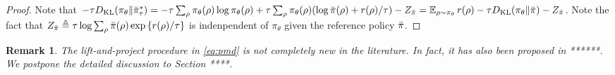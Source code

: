 \documentclass{article} %
\newtheorem{remark}{Remark}
\begin{document}
\begin{proof}
Note that $-\tau D_{\mathrm{KL}}(\pi_\theta \| \bar{\pi}_\tau^*) = - \tau \sum_{\rho}{ \pi_\theta(\rho) \log \pi_\theta(\rho) } + \tau \sum_{\rho}{ \pi_\theta(\rho) (\log \bar{\pi}(\rho) + r(\rho) / \tau ) }  - Z_{\bar{\pi}} = \operatorname*{\mathbb{E}}_{\rho \sim \pi_\theta}{  r(\rho)  - \tau D_{\mathrm{KL}}(\pi_\theta \| \bar{\pi}) } - Z_{\bar{\pi}}$. Note the fact that $Z_{\bar{\pi}} \triangleq \tau \log{ \sum_{\rho}{\bar{\pi}(\rho) \exp\left\{ r(\rho) / \tau \right\} } }$ is indenpendent of $\pi_\theta$ given the reference policy $\bar{\pi}$.
\end{proof}
\begin{remark}
	The lift-and-project procedure in \cref{eq:pmd} is not completely new in the literature. In fact, it has also been proposed in ******. We postpone the detailed discussion to Section ****.
\end{remark}
\end{document}

